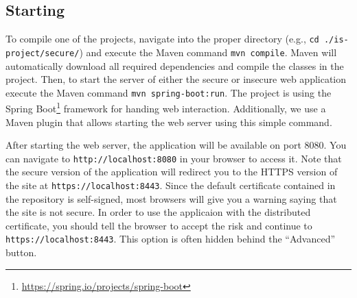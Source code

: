 \documentclass[conference,onecolumn,a4paper]{IEEEtran}
\begin{document}
\subsection{Starting}

To compile one of the projects, navigate into the proper directory (e.g., \verb|cd ./is-project/secure/|) and execute the Maven command \verb|mvn compile|. Maven will automatically download all required dependencies and compile the classes in the project. Then, to start the server of either the secure or insecure web application execute the Maven command \verb|mvn spring-boot:run|. The project is using the Spring Boot\footnote{\url{https://spring.io/projects/spring-boot}} framework for handing web interaction. Additionally, we use a Maven plugin that allows starting the web server using this simple command.

After starting the web server, the application will be available on port 8080. You can navigate to \verb|http://localhost:8080| in your browser to access it. Note that the secure version of the application will redirect you to the HTTPS version of the site at \verb|https://localhost:8443|. Since the default certificate contained in the repository is self-signed, most browsers will give you a warning saying that the site is not secure. In order to use the applicaion with the distributed certificate, you should tell the browser to accept the risk and continue to \verb|https://localhost:8443|. This option is often hidden behind the “Advanced” button.
\end{document}
